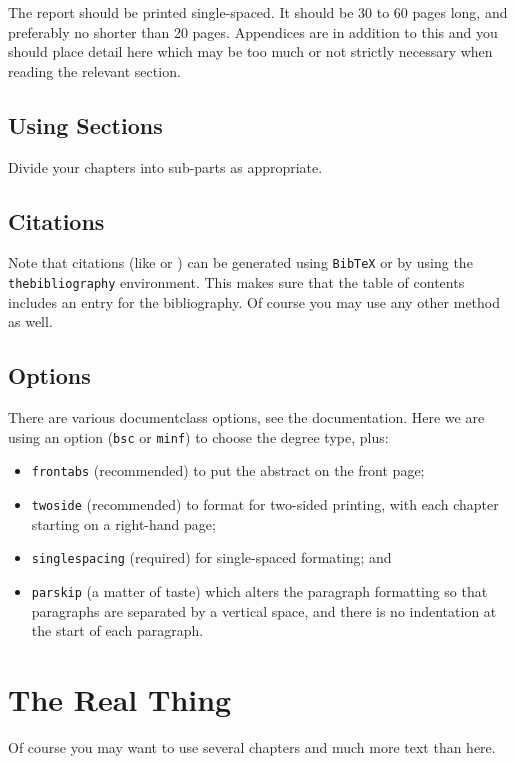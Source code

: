 \documentclass[bsc,frontabs,twoside,singlespacing,parskip,deptreport]{infthesis}
\begin{document}
The report should be printed single-spaced.
It should be 30 to 60 pages long, and preferably no shorter than 20 pages.
Appendices are in addition to this and you should place detail
here which may be too much or not strictly necessary when reading the relevant section.

\section{Using Sections}

Divide your chapters into sub-parts as appropriate.

\section{Citations}

Note that citations 
(like \cite{P1} or \cite{P2})
can be generated using {\tt BibTeX} or by using the
{\tt thebibliography} environment. This makes sure that the
table of contents includes an entry for the bibliography.
Of course you may use any other method as well.

\section{Options}

There are various documentclass options, see the documentation.  Here we are
using an option ({\tt bsc} or {\tt minf}) to choose the degree type, plus:
\begin{itemize}
\item {\tt frontabs} (recommended) to put the abstract on the front page;
\item {\tt twoside} (recommended) to format for two-sided printing, with
  each chapter starting on a right-hand page;
\item {\tt singlespacing} (required) for single-spaced formating; and
\item {\tt parskip} (a matter of taste) which alters the paragraph formatting so that
paragraphs are separated by a vertical space, and there is no
indentation at the start of each paragraph.
\end{itemize}

\chapter{The Real Thing}

Of course
you may want to use several chapters and much more text than here.



\end{document}

